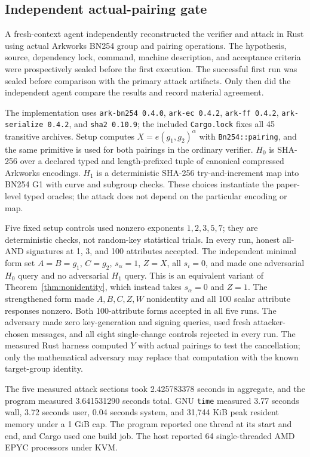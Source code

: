 \documentclass[10pt,a4paper]{article}
\begin{document}
\subsection{Independent actual-pairing gate}

A fresh-context agent independently reconstructed the verifier and attack in
Rust using actual Arkworks BN254 group and pairing operations. The hypothesis,
source, dependency lock, command, machine description, and acceptance criteria
were prospectively sealed before the first execution. The successful first
run was sealed before comparison with the primary attack artifacts. Only then
did the independent agent compare the results and record material agreement.

The implementation uses \texttt{ark-bn254 0.4.0},
\texttt{ark-ec 0.4.2}, \texttt{ark-ff 0.4.2},
\texttt{ark-serialize 0.4.2}, and \texttt{sha2 0.10.9}; the included
\texttt{Cargo.lock} fixes all 45 transitive archives. Setup computes
$X=e(g_1,g_2)^\alpha$ with \texttt{Bn254::pairing}, and the same primitive is
used for both pairings in the ordinary verifier. $H_0$ is SHA-256 over a
declared typed and length-prefixed tuple of canonical compressed Arkworks
encodings. $H_1$ is a deterministic SHA-256 try-and-increment map into BN254
G1 with curve and subgroup checks. These choices instantiate the paper-level
typed oracles; the attack does not depend on the particular encoding or map.

Five fixed setup controls used nonzero exponents $1,2,3,5,7$; they are
deterministic checks, not random-key statistical trials. In every run, honest
all-AND signatures at 1, 3, and 100 attributes accepted. The independent
minimal form set $A=B=g_1$, $C=g_2$, $s_\alpha=1$, $Z=X$, all $s_i=0$, and
made one adversarial $H_0$ query and no adversarial $H_1$ query. This is an
equivalent variant of Theorem~\ref{thm:nonidentity}, which instead takes
$s_\alpha=0$ and $Z=1$. The strengthened form made $A,B,C,Z,W$ nonidentity
and all 100 scalar attribute responses nonzero. Both 100-attribute forms
accepted in all five runs. The adversary made zero key-generation and signing queries,
used fresh attacker-chosen messages, and all eight single-change controls
rejected in every run. The measured Rust harness computed $Y$ with actual
pairings to test the cancellation; only the mathematical adversary may replace
that computation with the known target-group identity.

The five measured attack sections took 2.425783378 seconds in aggregate, and
the program measured 3.641531290 seconds total. GNU \texttt{time} measured
3.77 seconds wall, 3.72 seconds user, 0.04 seconds system, and 31,744 KiB peak
resident memory under a 1 GiB cap. The program reported one thread at its
start and end, and Cargo used one build job. The host reported 64
single-threaded AMD EPYC processors under KVM.
\end{document}
